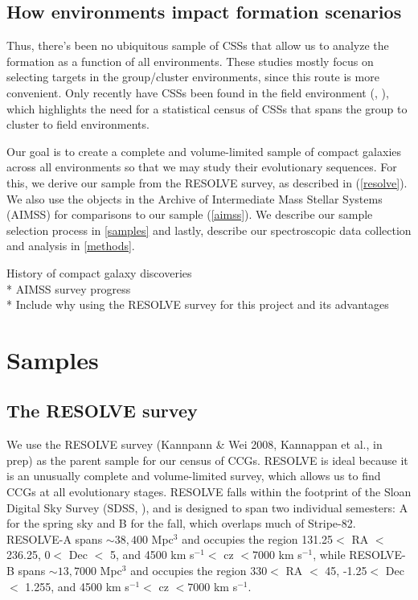 \documentclass[iop,apj,twocolappendix]{emulateapj}
\begin{document}
\subsection{How environments impact formation scenarios}
Thus, there's been no ubiquitous sample of CSSs that allow us to analyze the formation as a function of all environments. These studies mostly focus on selecting targets in the group/cluster environments, since this route is more convenient. Only recently have CSSs been found in the field environment (\cite{Huxor2013}, \cite{Chilingarian2015}), which highlights the need for a statistical census of CSSs that spans the group to cluster to field environments. 

\noindent Our goal is to create a complete and volume-limited sample of compact galaxies across all environments so that we may study their evolutionary sequences. For this, we derive our sample from the RESOLVE survey, as described in (\autoref{resolve}). We also use the objects in the Archive of Intermediate Mass Stellar Systems (AIMSS) for comparisons to our sample (\autoref{aimss}). We describe our sample selection process in \autoref{samples} and lastly, describe our spectroscopic data collection and analysis in \autoref{methods}.


\noindent * History of compact galaxy discoveries \\
* AIMSS survey progress \\
* Include why using the RESOLVE survey for this project and its advantages \\

\section{Samples}
\label{samples}

\subsection{The RESOLVE survey}
\label{resolve}

\noindent We use the RESOLVE survey (Kannpann \& Wei 2008, Kannappan et al., in prep) as the parent sample for our census of CCGs. RESOLVE is ideal because it is an unusually complete and volume-limited survey, which allows us to find CCGs at all evolutionary stages. RESOLVE falls within the footprint of the Sloan Digital Sky Survey (SDSS, \cite{York2000}), and is designed to span two individual semesters: A for the spring sky and B for the fall, which overlaps much of Stripe-82. RESOLVE-A spans $\sim38,400$ Mpc$^3$ and occupies the region 131.25\textdegree $<$ RA $<$ 236.25\textdegree, 0\textdegree $<$ Dec $<$ 5\textdegree, and 4500 km s$^{-1} <$ cz $< 7000$ km s$^{-1}$, while RESOLVE-B spans $\sim13,7000 $ Mpc$^3$ and occupies the region 330\textdegree $<$ RA $<$ 45\textdegree, -1.25\textdegree $<$ Dec $<$ 1.255\textdegree, and 4500 km s$^{-1} <$ cz $< 7000$ km s$^{-1}$.
\end{document}
